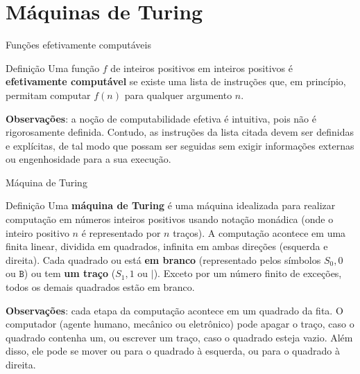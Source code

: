 \section{Máquinas de Turing}

\begin{frame}[fragile]{Funções efetivamente computáveis}

    \begin{block}{Definição}
        Uma função $f$ de inteiros positivos em inteiros positivos é \textbf{efetivamente 
        computável} se existe uma lista de instruções que, em princípio, permitam computar $f(n)$
        para qualquer argumento $n$.
    \end{block}

    \vspace{0.1in}

    \textbf{Observações}: a noção de computabilidade efetiva é intuitiva, pois não é rigorosamente
    definida. Contudo, as instruções da lista citada devem ser definidas e explícitas, de tal modo
    que possam ser seguidas sem exigir informações externas ou engenhosidade para a sua execução.
\end{frame}


\begin{frame}[fragile]{Máquina de Turing}

    \begin{block}{Definição}
        Uma \textbf{máquina de Turing} é uma máquina idealizada para realizar computação em 
        números inteiros positivos usando notação monádica (onde o inteiro positivo $n$ é 
        representado por $n$ traços). A computação acontece em uma finita linear, dividida em
        quadrados, infinita em ambas direções (esquerda e direita). Cada quadrado ou está 
        \textbf{em branco} (representado pelos símbolos $S_0, 0$ ou $\mathtt{B}$) ou tem 
        \textbf{um traço} ($S_1, 1$ ou $\mathtt{|}$).
        Exceto por um número finito de exceções, todos os demais quadrados estão em branco.
    \end{block}

    \vspace{0.1in}

    \textbf{Observações}: cada etapa da computação acontece em um quadrado da fita. O computador
    (agente humano, mecânico ou eletrônico) pode apagar o traço, caso o quadrado contenha um, ou 
    escrever um traço, caso o quadrado
    esteja vazio. Além disso, ele pode se mover ou para o quadrado à esquerda, ou para o quadrado
    à direita.
\end{frame}

